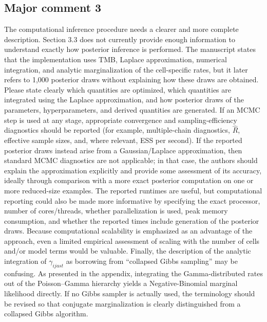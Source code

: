 \documentclass[11pt,a4paper]{article}
\newcommand{\refcomment}[2]{\par\Needspace{5\baselineskip}\subsection*{#1}#2\par}
\begin{document}
\refcomment{Major comment 3}{
The computational inference procedure needs a clearer and more complete description. Section 3.3 does not currently provide enough information to understand exactly how posterior inference is performed. The manuscript states that the implementation uses TMB, Laplace approximation, numerical integration, and analytic marginalization of the cell-specific rates, but it later refers to 1,000 posterior draws without explaining how these draws are obtained. Please state clearly which quantities are optimized, which quantities are integrated using the Laplace approximation, and how posterior draws of the parameters, hyperparameters, and derived quantities are generated. If an MCMC step is used at any stage, appropriate convergence and sampling-efficiency diagnostics should be reported (for example, multiple-chain diagnostics, $\widehat{R}$, effective sample sizes, and, where relevant, ESS per second). If the reported posterior draws instead arise from a Gaussian/Laplace approximation, then standard MCMC diagnostics are not applicable; in that case, the authors should explain the approximation explicitly and provide some assessment of its accuracy, ideally through comparison with a more exact posterior computation on one or more reduced-size examples. The reported runtimes are useful, but computational reporting could also be made more informative by specifying the exact processor, number of cores/threads, whether parallelization is used, peak memory consumption, and whether the reported times include generation of the posterior draws. Because computational scalability is emphasized as an advantage of the approach, even a limited empirical assessment of scaling with the number of cells and/or model terms would be valuable. Finally, the description of the analytic integration of $\gamma_{ijast}$ as borrowing from ``collapsed Gibbs sampling'' may be confusing. As presented in the appendix, integrating the Gamma-distributed rates out of the Poisson--Gamma hierarchy yields a Negative-Binomial marginal likelihood directly. If no Gibbs sampler is actually used, the terminology should be revised so that conjugate marginalization is clearly distinguished from a collapsed Gibbs algorithm.}
\end{document}

